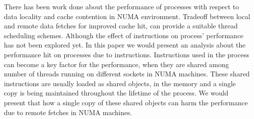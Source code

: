 There has been work done about the performance of processes with respect to data locality and cache contention in NUMA environment.
Tradeoff between local and remote data fetches for improved cache hit, can provide a suitable thread scheduling schemes.
Although the effect of instructions on process' performance has not been explored yet.
In this paper we would present an analysis about the performance hit on processes due to instructions.
Instructions used in the process can become a key factor for the performance, when they are shared among number of threads running on different sockets in NUMA machines.
These shared instructions are usually loaded as shared objects, in the memory and a single copy is being maintained throughout the lifetime of the process.
We would present that how a single copy of these shared objects can harm the performance due to remote fetches in NUMA machines.
